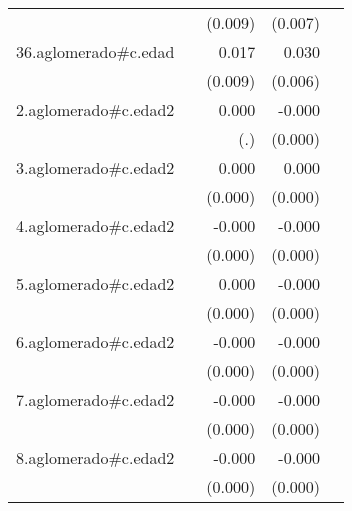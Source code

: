 {\begin{longtable}{l*{4}{D{.}{.}{-1}}}
            &                     &     (0.009)         &     (0.007)         &                     \\
\addlinespace
36.aglomerado#c.edad&                     &       0.017         &       0.030\sym{***}&                     \\
            &                     &     (0.009)         &     (0.006)         &                     \\
\addlinespace
2.aglomerado#c.edad2&                     &       0.000         &      -0.000         &                     \\
            &                     &         (.)         &     (0.000)         &                     \\
\addlinespace
3.aglomerado#c.edad2&                     &       0.000         &       0.000         &                     \\
            &                     &     (0.000)         &     (0.000)         &                     \\
\addlinespace
4.aglomerado#c.edad2&                     &      -0.000         &      -0.000\sym{***}&                     \\
            &                     &     (0.000)         &     (0.000)         &                     \\
\addlinespace
5.aglomerado#c.edad2&                     &       0.000         &      -0.000         &                     \\
            &                     &     (0.000)         &     (0.000)         &                     \\
\addlinespace
6.aglomerado#c.edad2&                     &      -0.000         &      -0.000         &                     \\
            &                     &     (0.000)         &     (0.000)         &                     \\
\addlinespace
7.aglomerado#c.edad2&                     &      -0.000         &      -0.000\sym{*}  &                     \\
            &                     &     (0.000)         &     (0.000)         &                     \\
\addlinespace
8.aglomerado#c.edad2&                     &      -0.000         &      -0.000         &                     \\
            &                     &     (0.000)         &     (0.000)         &                     \\

\end{longtable}}
